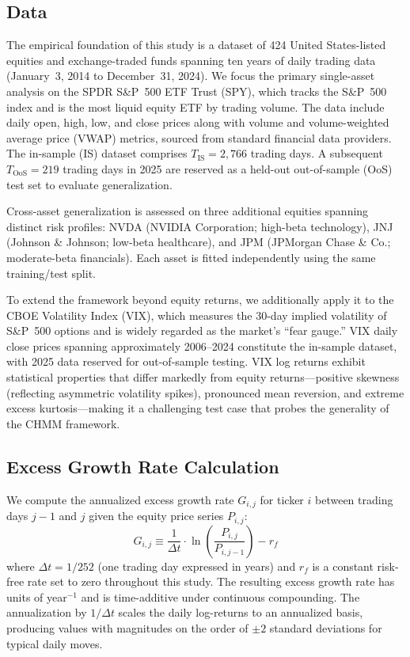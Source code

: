\subsection{Data}
\label{sec:data}

The empirical foundation of this study is a dataset of 424 United States-listed equities and exchange-traded funds spanning ten years of daily trading data (January~3, 2014 to December~31, 2024).
We focus the primary single-asset analysis on the SPDR S\&P~500 ETF Trust (SPY), which tracks the S\&P~500 index and is the most liquid equity ETF by trading volume.
The data include daily open, high, low, and close prices along with volume and volume-weighted average price (VWAP) metrics, sourced from standard financial data providers.
The in-sample (IS) dataset comprises $T_{\text{IS}} = 2{,}766$ trading days.
A subsequent $T_{\text{OoS}} = 219$ trading days in 2025 are reserved as a held-out out-of-sample (OoS) test set to evaluate generalization.

Cross-asset generalization is assessed on three additional equities spanning distinct risk profiles: NVDA (NVIDIA Corporation; high-beta technology), JNJ (Johnson \& Johnson; low-beta healthcare), and JPM (JPMorgan Chase \& Co.; moderate-beta financials).
Each asset is fitted independently using the same training/test split.

To extend the framework beyond equity returns, we additionally apply it to the CBOE Volatility Index (VIX), which measures the 30-day implied volatility of S\&P~500 options and is widely regarded as the market's ``fear gauge.''
VIX daily close prices spanning approximately 2006--2024 constitute the in-sample dataset, with 2025 data reserved for out-of-sample testing.
VIX log returns exhibit statistical properties that differ markedly from equity returns---positive skewness (reflecting asymmetric volatility spikes), pronounced mean reversion, and extreme excess kurtosis---making it a challenging test case that probes the generality of the CHMM framework.

\subsection{Excess Growth Rate Calculation}
\label{sec:growth_rate}

We compute the annualized excess growth rate $G_{i,j}$ for ticker $i$ between trading days $j-1$ and $j$ given the equity price series $P_{i,j}$:
\begin{equation}
    G_{i,j} \equiv \frac{1}{\Delta t} \cdot \ln\!\left(\frac{P_{i,j}}{P_{i,j-1}}\right) - r_f
    \label{eq:growth_rate}
\end{equation}
where $\Delta t = 1/252$ (one trading day expressed in years) and $r_f$ is a constant risk-free rate set to zero throughout this study.
The resulting excess growth rate has units of year$^{-1}$ and is time-additive under continuous compounding.
The annualization by $1/\Delta t$ scales the daily log-returns to an annualized basis, producing values with magnitudes on the order of $\pm 2$ standard deviations for typical daily moves.

